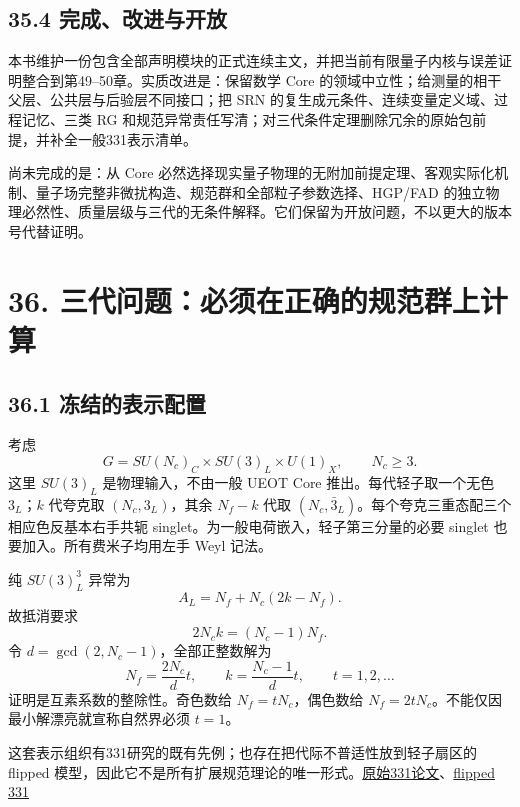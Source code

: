 \documentclass[
  11pt,
  oneside]{book}
\begin{document}
\hypertarget{ux5b8cux6210ux6539ux8fdbux4e0eux5f00ux653e}{%
\section{35.4
完成、改进与开放}\label{ux5b8cux6210ux6539ux8fdbux4e0eux5f00ux653e}}

本书维护一份包含全部声明模块的正式连续主文，并把当前有限量子内核与误差证明整合到第49--50章。实质改进是：保留数学
Core 的领域中立性；给测量的相干父层、公共层与后验层不同接口；把 SRN
的复生成元条件、连续变量定义域、过程记忆、三类 RG
和规范异常责任写清；对三代条件定理删除冗余的原始包前提，并补全一般331表示清单。

尚未完成的是：从 Core
必然选择现实量子物理的无附加前提定理、客观实际化机制、量子场完整非微扰构造、规范群和全部粒子参数选择、HGP/FAD
的独立物理必然性、质量层级与三代的无条件解释。它们保留为开放问题，不以更大的版本号代替证明。

\hypertarget{ch-36}{%
\chapter{36. 三代问题：必须在正确的规范群上计算}\label{ch-36}}

\hypertarget{ux51bbux7ed3ux7684ux8868ux793aux914dux7f6e}{%
\section{36.1
冻结的表示配置}\label{ux51bbux7ed3ux7684ux8868ux793aux914dux7f6e}}

考虑 \[
G=SU(N_c)_C\times SU(3)_L\times U(1)_X,\qquad N_c\ge3.
\] 这里 \(SU(3)_L\) 是物理输入，不由一般 UEOT Core
推出。每代轻子取一个无色 \(3_L\)；\(k\) 代夸克取 \((N_c,3_L)\)，其余
\(N_f-k\) 代取
\((N_c,\bar3_L)\)。每个夸克三重态配三个相应色反基本右手共轭
singlet。为一般电荷嵌入，轻子第三分量的必要 singlet
也要加入。所有费米子均用左手 Weyl 记法。

纯 \(SU(3)_L^3\) 异常为 \[
A_L=N_f+N_c(2k-N_f).
\] 故抵消要求 \[
2N_ck=(N_c-1)N_f.
\] 令 \(d=\gcd(2,N_c-1)\)，全部正整数解为 \[
N_f=\frac{2N_c}{d}t,\qquad
k=\frac{N_c-1}{d}t,\qquad t=1,2,\ldots
\tag{36.1}
\] 证明是互素系数的整除性。奇色数给 \(N_f=tN_c\)，偶色数给
\(N_f=2tN_c\)。不能仅因最小解漂亮就宣称自然界必须 \(t=1\)。

这套表示组织有331研究的既有先例；也存在把代际不普适性放到轻子扇区的
flipped
模型，因此它不是所有扩展规范理论的唯一形式。\href{https://arxiv.org/abs/hep-ph/9206242}{原始331论文}、\href{https://arxiv.org/abs/1606.01109}{flipped
331}
\end{document}
